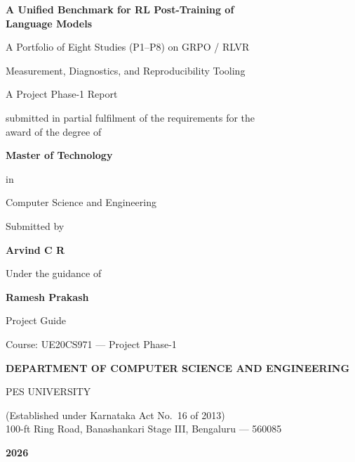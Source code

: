\documentclass[12pt,a4paper]{report}
\begin{document}
\begin{titlepage}
\centering
\thispagestyle{empty}
\vspace*{0.3in}

{\Large\bfseries A Unified Benchmark for RL Post-Training of\\[0.3em]
Language Models\par}
\vspace{0.6em}
{\large A Portfolio of Eight Studies (P1--P8) on GRPO / RLVR\par}
\vspace{0.3em}
{\normalsize Measurement, Diagnostics, and Reproducibility Tooling\par}

\vfill

{\large A Project Phase-1 Report\par}
\vspace{0.4em}
{\normalsize submitted in partial fulfilment of the requirements for the\\[0.2em]
award of the degree of\par}
\vspace{0.6em}
{\large\bfseries Master of Technology\par}
\vspace{0.3em}
{\normalsize in\par}
\vspace{0.3em}
{\large Computer Science and Engineering\par}

\vfill

{\normalsize Submitted by\par}
\vspace{0.4em}
{\large\bfseries Arvind C R\par}
\vspace{0.6em}
{\normalsize Under the guidance of\par}
\vspace{0.3em}
{\large\bfseries Ramesh Prakash\par}
{\normalsize Project Guide\par}

\vfill

{\normalsize Course: UE20CS971 --- Project Phase-1\par}
\vspace{0.8em}

{\large\bfseries DEPARTMENT OF COMPUTER SCIENCE AND ENGINEERING\par}
\vspace{0.3em}
{\large PES UNIVERSITY\par}
{\normalsize (Established under Karnataka Act No.\ 16 of 2013)\\
100-ft Ring Road, Banashankari Stage III, Bengaluru --- 560085\par}
\vspace{0.6em}
{\large\bfseries 2026\par}

\end{titlepage}
\end{document}

